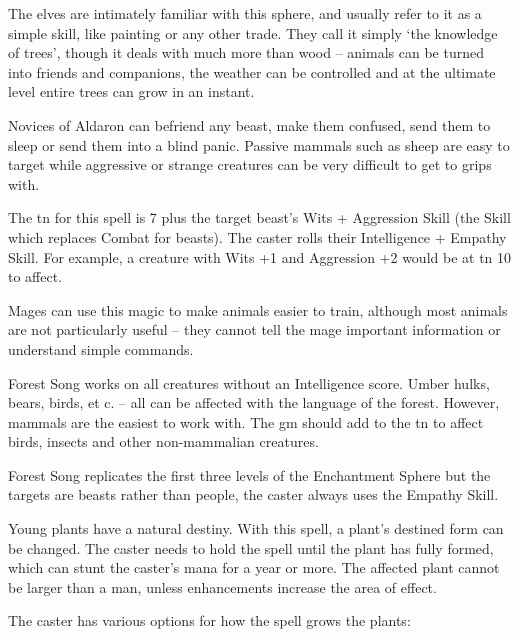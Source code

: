\begin{multicols}{2}

\noindent
The elves are intimately familiar with this sphere, and usually refer to it as a simple skill, like painting or any other trade. They call it simply `the knowledge of trees', though it deals with much more than wood -- animals can be turned into friends and companions, the weather can be controlled and at the ultimate level entire trees can grow in an instant.

\spelllevel

\label{forestsong}

Novices of Aldaron can befriend any beast, make them confused, send them to sleep or send them into a blind panic.
Passive mammals such as sheep are easy to target while aggressive or strange creatures can be very difficult to get to grips with.

The \gls{tn} for this spell is 7 plus the target beast's Wits + Aggression Skill (the Skill which replaces Combat for beasts). The caster rolls their Intelligence + Empathy Skill.
For example, a creature with Wits +1 and Aggression +2 would be at \gls{tn} 10 to affect.

Mages can use this magic to make animals easier to train, although most animals are not particularly useful -- they cannot tell the mage important information or understand simple commands.

Forest Song works on all creatures without an Intelligence score.
Umber hulks, bears, birds, et c. -- all can be affected with the language of the forest.
However, mammals are the easiest to work with.
The \gls{gm} should add to the \gls{tn} to affect birds, insects and other non-mammalian creatures.

Forest Song replicates the first three levels of the Enchantment Sphere but the targets are beasts rather than people, the caster always uses the Empathy Skill.


Young plants have a natural destiny.
With this spell, a plant's destined form can be changed.
The caster needs to hold the spell until the plant has fully formed, which can stunt the caster's mana for a year or more.
The affected plant cannot be larger than a man, unless enhancements increase the area of effect.

The caster has various options for how the spell grows the plants:


\end{multicols}
